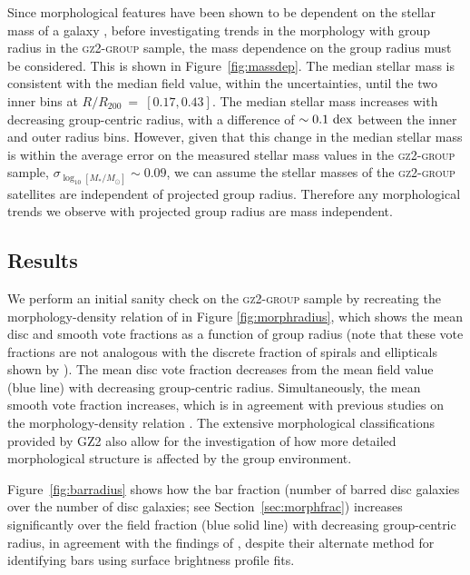 \documentclass[useAMS,usenatbib]{mn2e}
\def\minor		{\color{minorcol}}
\begin{document}
Since morphological features have been shown to be dependent on the stellar mass of a galaxy \citep[e.g. the increase in the bar fraction with stellar mass; see][]{nair10, skibba12}, before investigating trends in the morphology with group radius in the \textsc{gz2-group} sample, the mass dependence on the group radius must be considered. This is shown in Figure~\ref{fig:massdep}. The median stellar mass is consistent with the median field value, within the uncertainties, until the two inner bins at $R/R_{200}~=~[0.17, 0.43]$. The median stellar mass increases with decreasing group-centric radius, with a difference of $\sim0.1~\rm{dex}$ between the inner and outer radius bins. However, given that this change in the median stellar mass is within the average error on the measured stellar mass values in the \textsc{gz2-group} sample, $\sigma_{\log_{10}[M_*/M_{\odot}]}\sim 0.09$, we can assume the stellar masses of the \textsc{gz2-group} satellites are independent of projected group radius. Therefore any morphological trends we observe with projected group radius are mass independent.

\subsection{Results}

We perform an initial sanity check on the \textsc{gz2-group} sample by recreating the morphology-density relation of \citet{dressler80} in Figure \ref{fig:morphradius}, which shows the mean disc and smooth vote fractions as a function of group radius {\minor (note that these vote fractions are not analogous with the discrete fraction of spirals and ellipticals shown by \citealt{dressler80})}. The mean disc vote fraction decreases from the mean field value (blue line) with decreasing group-centric radius. Simultaneously, the mean smooth vote fraction increases, which is in agreement with previous studies on the morphology-density relation \citep{dressler80, smail97, poggianti99, postman05, Bamford09}. The extensive morphological classifications provided by GZ2 also allow for the investigation of how more detailed morphological structure is affected by the group environment.  

Figure~\ref{fig:barradius} shows how the bar fraction (number of barred disc galaxies over the number of disc galaxies; see Section~\ref{sec:morphfrac}) increases significantly over the field fraction (blue solid line) with decreasing group-centric radius, in agreement with the findings of \cite{barazza09}, despite their alternate method for identifying bars using surface brightness profile fits. 
\end{document}
